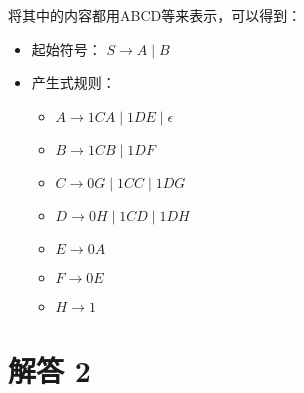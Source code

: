 \documentclass{article}
\begin{document}
	将其中的内容都用ABCD等来表示，可以得到：
	
	\begin{itemize}
		\item 起始符号：
		$ S \rightarrow A \mid B $
		
		\item 产生式规则：
		\begin{itemize}
			\item \( A \rightarrow 1CA \mid 1DE \mid \epsilon \)
			\item \( B \rightarrow 1CB \mid 1DF \)
			\item \( C \rightarrow 0G \mid 1CC \mid 1DG \)
			\item \( D \rightarrow 0H \mid 1CD \mid 1DH \)
			\item \( E \rightarrow 0A \)
			\item \( F \rightarrow 0E \)
			\item \( H \rightarrow 1 \)
		\end{itemize}
	\end{itemize}
	
	\section*{解答 2}
	
\end{document}
